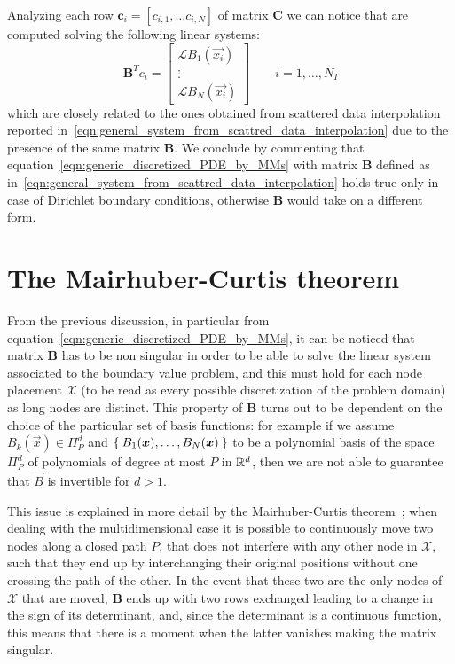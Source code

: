 Analyzing each row $\boldsymbol{c}_i = [c_{i,1}, \dots c_{i,N}]$ of matrix $\boldsymbol{C}$ we can notice that are computed solving the following linear systems:
\begin{equation}
	\boldsymbol{B}^T c_i = 
	\begin{bmatrix}
		\mathcal{L} B_1(\vec{x_i})  \\
		\vdots											  \\
		\mathcal{L} B_N(\vec{x_i})
	\end{bmatrix}
	\qquad i=1, \dots, N_I
\end{equation}
which are closely related to the ones obtained from scattered data interpolation reported in~\eqref{eqn:general_system_from_scattred_data_interpolation} due to the presence of the same matrix $\boldsymbol{B}$. We conclude by commenting that equation~\eqref{eqn:generic_discretized_PDE_by_MMs} with matrix $\boldsymbol{B}$ defined as in~\eqref{eqn:general_system_from_scattred_data_interpolation} holds true only in case of Dirichlet boundary conditions, otherwise $\boldsymbol{B}$ would take on a different form.



\section{The Mairhuber-Curtis theorem}
\label{sec:Mairhubert-Curtis}

From the previous discussion, in particular from equation~\eqref{eqn:generic_discretized_PDE_by_MMs}, it can be noticed that matrix $\boldsymbol{B}$ has to be non singular in order to be able to solve the linear system associated to the boundary value problem, and this must hold for each node placement $\mathcal{X}$ (to be read as every possible discretization of the problem domain) as long nodes are distinct. This property of $\boldsymbol{B}$ turns out to be dependent on the choice of the particular set of basis functions: for example if we assume $B_k(\vec{x})\in\Pi_P^d$ and $\Set{B_1(\boldsymbol{x}), \dots, B_N(\boldsymbol{x})}$ to be a polynomial basis of the space $\Pi_P^d$ of polynomials of degree at most $P$ in $\mathbb{R}^d$, then we are not able to guarantee that $\vec{B}$ is invertible for $d>1$.

This issue is explained in more detail by the Mairhuber-Curtis theorem~\cite{Mairhuber:interpolation_basis_problem}; when dealing with the multidimensional case it is possible to continuously move two nodes along a closed path $P$, that does not interfere with any other node in $\mathcal{X}$, such that they end up by interchanging their original positions without one crossing the path of the other. In the event that these two are the only nodes of $\mathcal{X}$ that are moved, $\boldsymbol{B}$ ends up with two rows exchanged leading to a change in the sign of its determinant, and, since the determinant is a continuous function, this means that there is a moment when the latter vanishes making the matrix singular.

